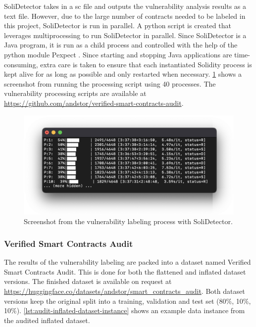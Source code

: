 
SoliDetector takes in a \acrshort{sc} file and outputs the vulnerability analysis results as a text file. However, due to the large number of contracts needed to be labeled in this project, SoliDetector is run in parallel. A python script is created that leverages multiprocessing to run SoliDetector in parallel. Since SoliDetector is a Java program, it is run as a child process and controlled with the help of the python module Pexpect \cite{pexpect}. Since starting and stopping Java applications are time-consuming, extra care is taken to ensure that each instantiated Solidity process is kept alive for as long as possible and only restarted when necessary. \cref{fig:solidetector-vulnerability-labeling} shows a screenshot from running the processing script using 40 processes. The vulnerability processing scripts are available at \url{https://github.com/andstor/verified-smart-contracts-audit}.

\begin{figure}
    \centering
    \includegraphics[width=\textwidth]{figures/solidetector-run.png}
    \caption{Screenshot from the vulnerability labeling process with SoliDetector.}
    \label{fig:solidetector-vulnerability-labeling}
\end{figure}

\subsubsection{Verified Smart Contracts Audit}
\label{sec:verified-smart-contracts-audit}
The results of the vulnerability labeling are packed into a dataset named Verified Smart Contracts Audit. This is done for both the flattened and inflated dataset versions. The finished dataset is available on request at \url{https://huggingface.co/datasets/andstor/smart_contracts_audit}. Both dataset versions keep the original split into a training, validation and test set (80\%, 10\%, 10\%). \cref{lst:audit-inflated-dataset-instance} shows an example data instance from the audited inflated dataset.

